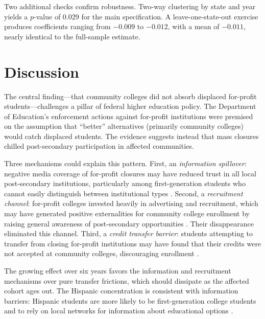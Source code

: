 \documentclass[12pt]{article}
\begin{document}


Two additional checks confirm robustness. Two-way clustering by state and year yields a $p$-value of 0.029 for the main specification. A leave-one-state-out exercise produces coefficients ranging from $-0.009$ to $-0.012$, with a mean of $-0.011$, nearly identical to the full-sample estimate.

\section{Discussion}

The central finding---that community colleges did not absorb displaced for-profit students---challenges a pillar of federal higher education policy. The Department of Education's enforcement actions against for-profit institutions were premised on the assumption that ``better'' alternatives (primarily community colleges) would catch displaced students. The evidence suggests instead that mass closures chilled post-secondary participation in affected communities.

Three mechanisms could explain this pattern. First, an \textit{information spillover}: negative media coverage of for-profit closures may have reduced trust in all local post-secondary institutions, particularly among first-generation students who cannot easily distinguish between institutional types \citep{Hoxby2013}. Second, a \textit{recruitment channel}: for-profit colleges invested heavily in advertising and recruitment, which may have generated positive externalities for community college enrollment by raising general awareness of post-secondary opportunities \citep{DemingEtAl2012}. Their disappearance eliminated this channel. Third, a \textit{credit transfer barrier}: students attempting to transfer from closing for-profit institutions may have found that their credits were not accepted at community colleges, discouraging enrollment \citep{Simone2014}.

The growing effect over six years favors the information and recruitment mechanisms over pure transfer frictions, which should dissipate as the affected cohort ages out. The Hispanic concentration is consistent with information barriers: Hispanic students are more likely to be first-generation college students and to rely on local networks for information about educational options \citep{Krogstad2016}.
\end{document}
